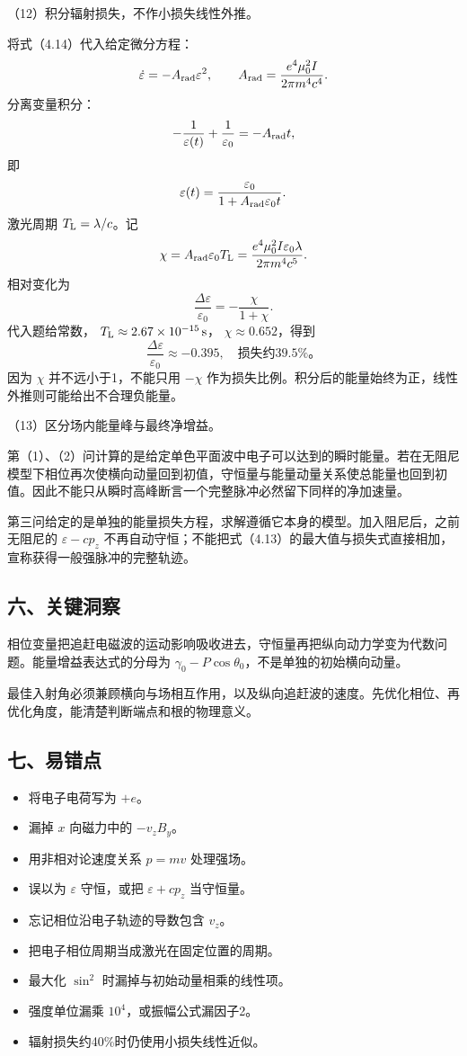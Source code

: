 \documentclass[12pt,a4paper,fontset=fandol]{ctexart}
\providecommand{\tightlist}{\setlength{\itemsep}{0pt}\setlength{\parskip}{0pt}}
\begin{document}
（12）积分辐射损失，不作小损失线性外推。

将式（4.14）代入给定微分方程： \[
\dot\varepsilon=-A_{\rm rad}\varepsilon^2,\qquad
A_{\rm rad}=\frac{e^4\mu_0^2I}{2\pi m^4c^4}.
\] 分离变量积分： \[
-\frac1{\varepsilon(t)}+\frac1{\varepsilon_0}
=-A_{\rm rad}t,
\] 即 \[
\varepsilon(t)=\frac{\varepsilon_0}
{1+A_{\rm rad}\varepsilon_0t}.
\] 激光周期 \(T_{\rm L}=\lambda/c\)。记 \[
\chi=A_{\rm rad}\varepsilon_0T_{\rm L}
=\frac{e^4\mu_0^2I\varepsilon_0\lambda}
{2\pi m^4c^5}.
\] 相对变化为 \[
\boxed{\frac{\Delta\varepsilon}{\varepsilon_0}
=-\frac{\chi}{1+\chi}.}\tag{4.15}
\] 代入题给常数， \(T_{\rm L}\approx2.67\times10^{-15}\,\mathrm s\)，
\(\chi\approx0.652\)，得到 \[
\boxed{\frac{\Delta\varepsilon}{\varepsilon_0}
\approx-0.395,\quad\text{损失约39.5\%。}}
\] 因为 \(\chi\) 并不远小于1，不能只用 \(-\chi\)
作为损失比例。积分后的能量始终为正，线性外推则可能给出不合理负能量。

（13）区分场内能量峰与最终净增益。

第（1）、（2）问计算的是给定单色平面波中电子可以达到的瞬时能量。若在无阻尼模型下相位再次使横向动量回到初值，守恒量与能量动量关系使总能量也回到初值。因此不能只从瞬时高峰断言一个完整脉冲必然留下同样的净加速量。

第三问给定的是单独的能量损失方程，求解遵循它本身的模型。加入阻尼后，之前无阻尼的
\(\varepsilon-cp_z\)
不再自动守恒；不能把式（4.13）的最大值与损失式直接相加，宣称获得一般强脉冲的完整轨迹。

\subsection{六、关键洞察}\label{ux516dux5173ux952eux6d1eux5bdf-3}

相位变量把追赶电磁波的运动影响吸收进去，守恒量再把纵向动力学变为代数问题。能量增益表达式的分母为
\(\gamma_0-P\cos\theta_0\)，不是单独的初始横向动量。

最佳入射角必须兼顾横向与场相互作用，以及纵向追赶波的速度。先优化相位、再优化角度，能清楚判断端点和根的物理意义。

\subsection{七、易错点}\label{ux4e03ux6613ux9519ux70b9-3}

\begin{itemize}
\tightlist
\item
  将电子电荷写为 \(+e\)。
\item
  漏掉 \(x\) 向磁力中的 \(-v_zB_y\)。
\item
  用非相对论速度关系 \(p=mv\) 处理强场。
\item
  误以为 \(\varepsilon\) 守恒，或把 \(\varepsilon+cp_z\) 当守恒量。
\item
  忘记相位沿电子轨迹的导数包含 \(v_z\)。
\item
  把电子相位周期当成激光在固定位置的周期。
\item
  最大化 \(\sin^2\) 时漏掉与初始动量相乘的线性项。
\item
  强度单位漏乘 \(10^4\)，或振幅公式漏因子2。
\item
  辐射损失约40\%时仍使用小损失线性近似。
\end{itemize}
\end{document}
